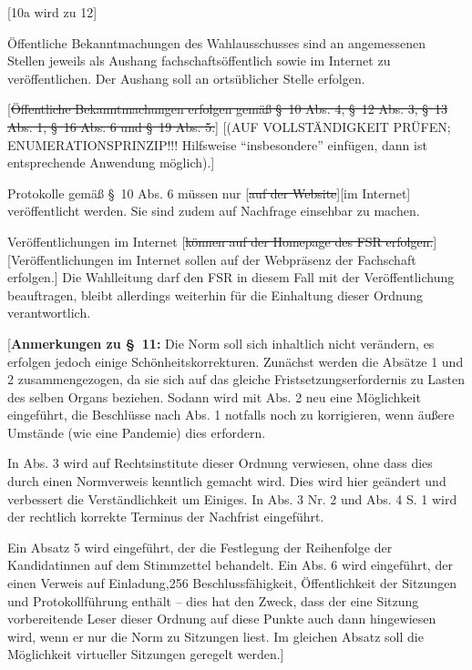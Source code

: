 \documentclass[%
draft,%
multilinesections%
]{fswo}
\newcommand\oldT[1]  {{\color{Gray}[\st{#1}]}}
\newcommand\newT[1]  {{\color{Green}[#1]}}
\newcommand\bemFr[1] {{\color{Red}[#1]}}
\newcommand\bemFe[1] {{\color{Cyan}[#1]}}
\newcommand\oldT[1]{}%
\newcommand\newT[1]{#1}
\newcommand\bemFr[1]{}%
\newcommand\bemFe[1]{}%
\newcommand\change[2]{\oldT{#1}\newT{#2}}
\begin{document}
\bemFe{10a wird zu 12}

\begin{contract}
Öffentliche Bekanntmachungen des Wahlausschusses sind an angemessenen Stellen jeweils als Aushang fachschaftsöffentlich sowie im Internet zu veröffentlichen.
Der Aushang soll an ortsüblicher Stelle erfolgen.

\oldT{Öffentliche Bekanntmachungen erfolgen gemäß \S~10 Abs. 4, \S~12 Abs. 3, \S~13 Abs. 1, \S~16 Abs. 6 und \S~19 Abs. 5.} \bemFr{(AUF VOLLSTÄNDIGKEIT PRÜFEN; ENUMERATIONSPRINZIP!!! Hilfsweise \enquote{insbesondere} einfügen, dann ist entsprechende Anwendung möglich).}

Protokolle gemäß \S~10 Abs. 6 müssen nur \change{auf der Website}{im Internet} veröffentlicht werden.
Sie sind zudem auf Nachfrage einsehbar zu machen.

Veröffentlichungen im Internet \change{können auf der Homepage des FSR erfolgen.}{Veröffentlichungen im Internet sollen auf der Webpräsenz der Fachschaft erfolgen.}
Die Wahlleitung darf den FSR in diesem Fall mit der Veröffentlichung beauftragen, bleibt allerdings weiterhin für die Einhaltung dieser Ordnung verantwortlich.
\end{contract}

\bemFr{\textbf{Anmerkungen zu \S~11:}
Die Norm soll sich inhaltlich nicht verändern, es erfolgen jedoch einige Schönheitskorrekturen.
Zunächst werden die Absätze 1 und 2 zusammengezogen, da sie sich auf das gleiche Fristsetzungserfordernis zu Lasten des selben Organs beziehen.
Sodann wird mit Abs. 2 neu eine Möglichkeit eingeführt, die Beschlüsse nach Abs. 1 notfalls noch zu korrigieren,
wenn äußere Umstände (wie eine Pandemie) dies erfordern.

In Abs. 3 wird auf Rechtsinstitute dieser Ordnung verwiesen, ohne dass dies durch einen Normverweis kenntlich gemacht wird.
Dies wird hier geändert und verbessert die Verständlichkeit um Einiges.
In Abs. 3 Nr. 2 und Abs. 4 S. 1 wird der rechtlich korrekte Terminus der Nachfrist eingeführt.

Ein Absatz 5 wird eingeführt, der die Festlegung der Reihenfolge der Kandidatinnen auf dem Stimmzettel behandelt.
Ein Abs. 6 wird eingeführt, der einen Verweis auf Einladung,256 Beschlussfähigkeit, Öffentlichkeit der Sitzungen und Protokollführung enthält –
dies hat den Zweck, dass der eine Sitzung vorbereitende Leser dieser Ordnung auf diese Punkte auch dann hingewiesen wird,
wenn er nur die Norm zu Sitzungen liest. Im gleichen Absatz soll die Möglichkeit virtueller Sitzungen geregelt werden.}
\end{document}
